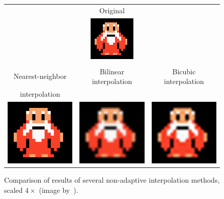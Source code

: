 \begin{figure}[t]
\centering
{\sffamily
\begin{tabular}{ccc}
& Original & \\
&\includegraphics{img/preprocessing/interp_original.png}&\\
\vspace{1em} \\
Nearest-neighbor& Bilinear interpolation & Bicubic interpolation \\
interpolation &&\\
\includegraphics[width=.3\linewidth]{img/preprocessing/interp_nearestNeighbor.png}
&
\includegraphics[width=.3\linewidth]{img/preprocessing/interp_bilinear.png}
&
\includegraphics[width=.3\linewidth]{img/preprocessing/interp_bicubic.png}
\end{tabular}
}
\caption{Comparison of results of several non-adaptive interpolation methods, scaled $4{\times}$ (image by~\citet{nonAdaptiveInterp}).}
\label{fig:preprocessInterpolation}
\end{figure}

